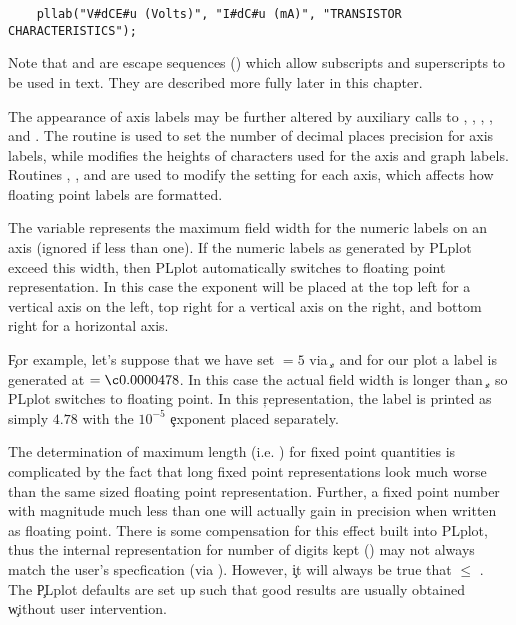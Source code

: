 \begin{verbatim}
    pllab("V#dCE#u (Volts)", "I#dC#u (mA)", "TRANSISTOR CHARACTERISTICS");
\end{verbatim}

Note that  and  are escape sequences () which allow subscripts and superscripts to be used in text.
They are described more fully later in this chapter.

The appearance of axis labels may be further altered by auxiliary calls
to , , , , and
.  The routine  is used to set the number of
decimal places precision for axis labels, while  modifies
the heights of characters used for the axis and graph labels.  Routines
, , and  are used to modify the
 setting for each axis, which affects how floating point
labels are formatted.

The  variable represents the maximum field width for the
numeric labels on an axis (ignored if less than one).  If the numeric
labels as generated by PLplot exceed this width, then PLplot automatically
switches to floating point representation.  In this case the exponent will
be placed at the top left for a vertical axis on the left, top right for
a vertical axis on the right, and bottom right for a horizontal axis.

\c For example, let's suppose that we have set  $ = 5$ via
\c {}, and for our plot a label is generated at  $ =
\c 0.0000478$.  In this case the actual field width is longer than
\c {}, so PLplot switches to floating point.  In this
\c representation, the label is printed as simply $4.78$ with the $10^{-5}$
\c exponent placed separately.

The determination of maximum length (i.e. ) for fixed point
quantities is complicated by the fact that long fixed point
representations look much worse than the same sized floating point
representation.  Further, a fixed point number with magnitude much less
than one will actually gain in precision when written as floating point.
There is some compensation for this effect built into PLplot, thus the
internal representation for number of digits kept () may
not always match the user's specfication (via ).  However,
\c it will always be true that  $\le$ .  The
\c PLplot defaults are set up such that good results are usually obtained
\c without user intervention.

